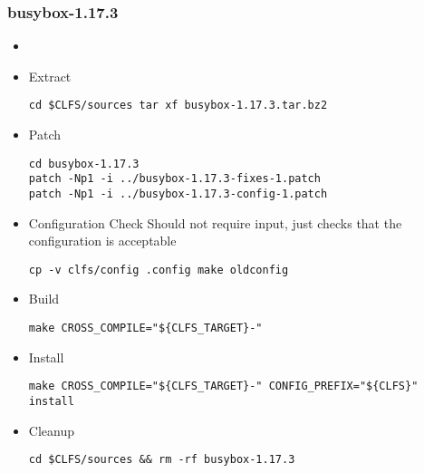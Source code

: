 \subsubsection{busybox-1.17.3}
\begin{itemize}\item 
  \item Extract
    \begin{lstlisting}
cd $CLFS/sources tar xf busybox-1.17.3.tar.bz2
    \end{lstlisting}
  \item Patch
    \begin{lstlisting}
cd busybox-1.17.3
patch -Np1 -i ../busybox-1.17.3-fixes-1.patch
patch -Np1 -i ../busybox-1.17.3-config-1.patch
    \end{lstlisting}
  \item Configuration Check
Should not require input, just checks that the configuration is acceptable
\begin{lstlisting}
cp -v clfs/config .config make oldconfig
\end{lstlisting}
  \item Build
    \begin{lstlisting}
make CROSS_COMPILE="${CLFS_TARGET}-"
    \end{lstlisting}
  \item Install
    \begin{lstlisting}
make CROSS_COMPILE="${CLFS_TARGET}-" CONFIG_PREFIX="${CLFS}" install
    \end{lstlisting}
  \item Cleanup
    \begin{lstlisting}
cd $CLFS/sources && rm -rf busybox-1.17.3
    \end{lstlisting}
\end{itemize}

